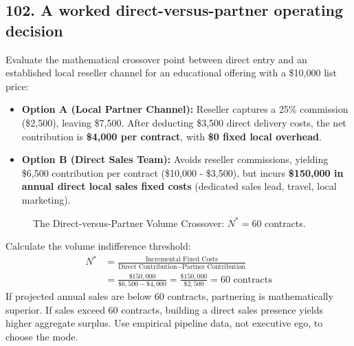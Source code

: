 \subsection{102. A worked direct-versus-partner operating decision}

Evaluate the mathematical crossover point between direct entry and an established local reseller channel for an educational offering with a \$10,000 list price:
\begin{itemize}
    \item \textbf{Option A (Local Partner Channel):} Reseller captures a 25\% commission (\$2,500), leaving \$7,500. After deducting \$3,500 direct delivery costs, the net contribution is \textbf{\$4,000 per contract}, with \textbf{\$0 fixed local overhead}.
    \item \textbf{Option B (Direct Sales Team):} Avoids reseller commissions, yielding \$6,500 contribution per contract (\$10,000 - \$3,500), but incurs \textbf{\$150,000 in annual direct local sales fixed costs} (dedicated sales lead, travel, local marketing).
\end{itemize}

\begin{figure}[htbp]
\centering
{}
\caption{The Direct-versus-Partner Volume Crossover: $N^* = 60$ contracts.}
\label{fig:partner_crossover}
\end{figure}

Calculate the volume indifference threshold:
\begin{equation}
\begin{aligned}
N^* &= \frac{\text{Incremental Fixed Costs}}{\text{Direct Contribution} - \text{Partner Contribution}} \\
&= \frac{\$150,000}{\$6,500 - \$4,000} = \frac{\$150,000}{\$2,500} = 60 \text{ contracts}
\end{aligned}
\end{equation}
If projected annual sales are below 60 contracts, partnering is mathematically superior. If sales exceed 60 contracts, building a direct sales presence yields higher aggregate surplus. Use empirical pipeline data, not executive ego, to choose the mode.


